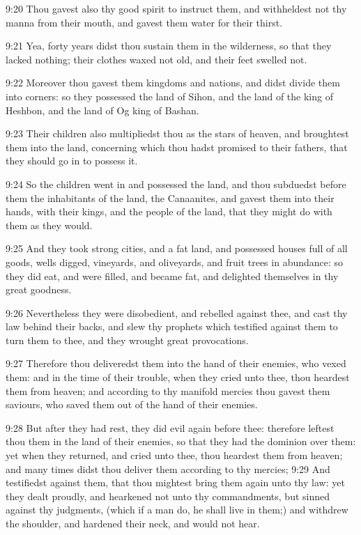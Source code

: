 9:20 Thou gavest also thy good spirit to instruct them, and
withheldest not thy manna from their mouth, and gavest them water for
their thirst.

9:21 Yea, forty years didst thou sustain them in the wilderness, so
that they lacked nothing; their clothes waxed not old, and their feet
swelled not.

9:22 Moreover thou gavest them kingdoms and nations, and didst divide
them into corners: so they possessed the land of Sihon, and the land
of the king of Heshbon, and the land of Og king of Bashan.

9:23 Their children also multipliedst thou as the stars of heaven, and
broughtest them into the land, concerning which thou hadst promised to
their fathers, that they should go in to possess it.

9:24 So the children went in and possessed the land, and thou
subduedst before them the inhabitants of the land, the Canaanites, and
gavest them into their hands, with their kings, and the people of the
land, that they might do with them as they would.

9:25 And they took strong cities, and a fat land, and possessed houses
full of all goods, wells digged, vineyards, and oliveyards, and fruit
trees in abundance: so they did eat, and were filled, and became fat,
and delighted themselves in thy great goodness.

9:26 Nevertheless they were disobedient, and rebelled against thee,
and cast thy law behind their backs, and slew thy prophets which
testified against them to turn them to thee, and they wrought great
provocations.

9:27 Therefore thou deliveredst them into the hand of their enemies,
who vexed them: and in the time of their trouble, when they cried unto
thee, thou heardest them from heaven; and according to thy manifold
mercies thou gavest them saviours, who saved them out of the hand of
their enemies.

9:28 But after they had rest, they did evil again before thee:
therefore leftest thou them in the land of their enemies, so that they
had the dominion over them: yet when they returned, and cried unto
thee, thou heardest them from heaven; and many times didst thou
deliver them according to thy mercies; 9:29 And testifiedst against
them, that thou mightest bring them again unto thy law: yet they dealt
proudly, and hearkened not unto thy commandments, but sinned against
thy judgments, (which if a man do, he shall live in them;) and
withdrew the shoulder, and hardened their neck, and would not hear.

